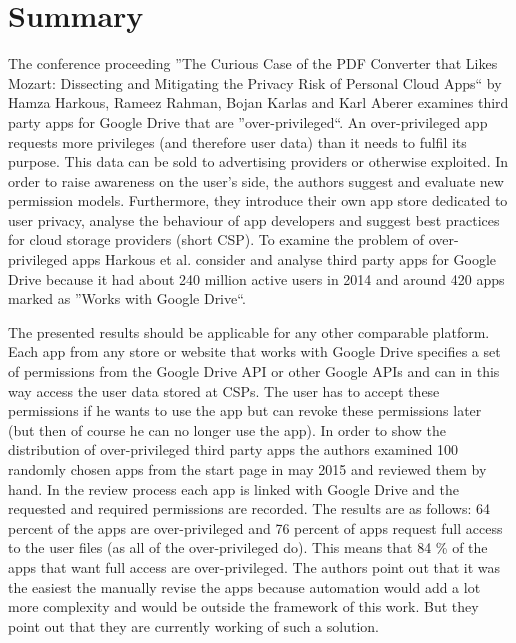 \documentclass[11pt,twocolumn,a4paper,DIV=calc]{scrartcl}
\begin{document}
\section{Summary}
The conference proceeding ''The Curious Case of the PDF Converter that Likes Mozart: Dissecting and Mitigating the Privacy Risk of Personal Cloud Apps`` by Hamza Harkous, Rameez Rahman, Bojan Karlas and Karl Aberer \cite{Paper} examines third party apps for Google Drive that are ''over-privileged``. An over-privileged app requests more privileges (and therefore user data) than it needs to fulfil its purpose. This data can be sold to advertising providers or otherwise exploited. In order to raise awareness on the user's side, the authors suggest and evaluate new permission models. Furthermore, they introduce their own app store dedicated to user privacy, analyse the behaviour of app developers and suggest best practices for cloud storage providers (short CSP). To examine the problem of over-privileged apps Harkous et al. consider and analyse third party apps for Google Drive because it had about 240 million active users in 2014 and around 420 apps marked as ''Works with Google Drive``. 

The presented results should be applicable for any other comparable platform. Each app from any store or website that works with Google Drive specifies a set of permissions from the Google Drive API or other Google APIs and can in this way access the user data stored at CSPs. The user has to accept these permissions if he wants to use the app but can revoke these permissions later (but then of course he can no longer use the app). In order to show the distribution of over-privileged third party apps the authors examined 100 randomly chosen apps from the start page in may 2015 and reviewed them by hand. 
In the review process each app is linked with Google Drive and the requested and required permissions are recorded. The results are as follows: 64 percent of the apps are over-privileged and 76 percent of apps request full access to the user files (as all of the over-privileged do). This means that 84 \% of the apps that want full access are over-privileged. The authors point out that it was the easiest the manually revise the apps because automation would add a lot more complexity and would be outside the framework of this work. But they point out that they are currently working of such a solution. 
\end{document}
